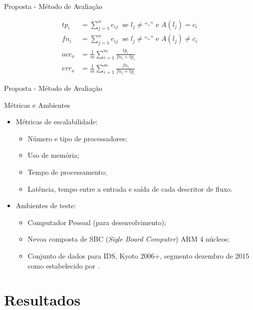 \documentclass[aspectratio=1610,10pt]{beamer}
\begin{document}
\begin{frame}[fragile]{Proposta - Método de Avaliação}
{\hspace{0.5cm}
\begin{minipage}{.45\textwidth}
  \begin{align}
    tp_i &= \sum_{j=1}^{n} e_{ij} \; \text{ se } l_j \neq \text{``-''} \text{ e } A(l_j) = c_i\\
    fn_i &= \sum_{j=1}^{n} e_{ij} \; \text{ se } l_j \neq \text{``-''} \text{ e } A(l_j) \neq c_i\\
    \mathit{acc}_x &= \frac{1}{m} \sum_{i=1}^{m} \frac{tp_i}{fn_i + tp_i}\\
    \mathit{err}_x &= \frac{1}{m} \sum_{i=1}^{m} \frac{fn_i}{fn_i + tp_i}%
  \end{align}%
\end{minipage}
}
\end{frame}

\begin{frame}[fragile]{Proposta - Método de Avaliação}
  \begin{alertblock}{Métricas e Ambientes}
    \begin{itemize}
      \item Métricas de escalabilidade:
      \begin{itemize}
        \item Número e tipo de processadores;
        \item Uso de memória;
        \item Tempo de processamento;
        \item Latência, tempo entre a entrada e saída de cada descritor de fluxo.
      \end{itemize}
      \item Ambientes de teste:
      \begin{itemize}
        \item Computador Pessoal (para desenvolvimento);
        \item Nevoa composta de SBC (\emph{Sigle Board Computer}) ARM 4 núcleos;
        \item Conjunto de dados para IDS, Kyoto 2006+, segmento dezembro de 2015
        como estabelecido por .
      \end{itemize}
    \end{itemize}
  \end{alertblock}
\end{frame}

\section{Resultados}
\end{document}
